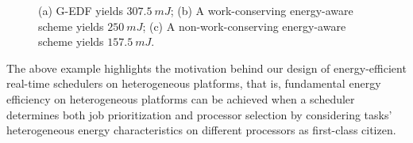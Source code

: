  
 \begin{figure}
\centering
{}
\vspace{-2mm}
\caption{\small (a) G-EDF yields $307.5~mJ$; (b) A work-conserving energy-aware scheme yields $250~mJ$; (c) A non-work-conserving energy-aware scheme yields $157.5~mJ$.}\normalsize
\vspace{-2mm}
\end{figure}

The above example highlights the motivation behind our design of energy-efficient real-time schedulers on heterogeneous platforms, that is, fundamental energy efficiency on heterogeneous platforms can be achieved when a scheduler determines both job prioritization and processor selection by considering tasks' heterogeneous energy characteristics on different processors as first-class citizen.


